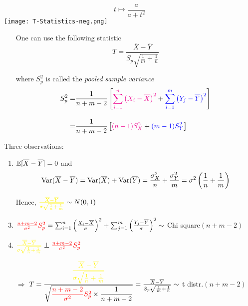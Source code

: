 \begin{frame}
\centering
\[
	t\mapsto  \frac{a}{a+t^2}
\]
\vfill
\texttt{[image: T-Statistics-neg.png]}
\end{frame}
\begin{frame}

	\begin{enumerate}
		\item[] One can use the following statistic \\[1em]
			\[
				T =  \frac{\overline{X}-\overline{Y}}{S_p \sqrt{ \frac{1}{m}+ \frac{1}{n} }}
			\]
			\vfill
		\item[] where $S_p^2$ is called the \textcolor{yellow!80!black}{\it pooled sample variance}\\[1em]
			\begin{align*}
				S_p^2 =&  \frac{1}{n+m-2}\left[  \textcolor{magenta}{\sum_{i=1}^n \left(X_i -\overline{X} \right )^2}+ \textcolor{blue}{\sum_{i=1}^m \left(Y_j -\overline{Y} \right )^2}\right ]
				\\[1em] =&  \frac{1}{n+m-2}\left[ \textcolor{magenta}{(n-1)S_X^2} + \textcolor{blue}{(m-1) S_Y^2} \right ]
			\end{align*}
	\end{enumerate}
\end{frame}
\begin{frame}
Three observations:
\vfill
	\begin{enumerate}
		\item $\mathbb{E}[\overline{X}-\overline{Y}] = 0$ and
			\[
\text{Var}(\overline{X}-\overline{Y}) =
\text{Var}(\overline{X})+ \text{Var}(\overline{Y})
=  \frac{\sigma_X^2}{n} +  \frac{\sigma_Y^2}{m}
= \sigma^2 \left(  \frac{1}{n}+  \frac{1}{m}\right)
\]
\item[] Hence, $\textcolor{yellow}{\frac{\overline{X}-\overline{Y}}{\sigma\sqrt{\frac 1n + \frac 1m}}}\sim N(0,1)$
\vfill
\item $\textcolor{red}{\frac{n+m-2}{\sigma^2} S_p^2} = \sum_{i=1}^n \left(\frac{X_i-\overline{X}}{\sigma}\right)^2
	+ \sum_{j=1}^m \left(\frac{Y_j-\overline{Y}}{\sigma}\right)^2 \sim $ Chi square$(n+m-2)$
	\vfill
\item $\textcolor{yellow}{\frac{\overline{X}-\overline{Y}}{\sigma\sqrt{\frac 1n + \frac 1m}}} \perp  \textcolor{red}{\frac{n+m-2}{\sigma^2}S_p^2}$
	\vfill
\item[$\Longrightarrow$] $T = \frac{\displaystyle\textcolor{yellow}{\frac{\overline{X}-\overline{Y}}{\sigma\sqrt{\frac 1n+\frac 1m}}} }{\displaystyle\sqrt{\textcolor{red}{\frac{n+m-2}{\sigma^2} S_p^2}\times \frac{1}{n+m-2} }} = \frac{\overline{X}-\overline{Y}}{S_p \sqrt{ \frac{1}{m}+ \frac{1}{n} }} \sim $ t distr.$(n+m-2)$
	\end{enumerate}
\end{frame}
